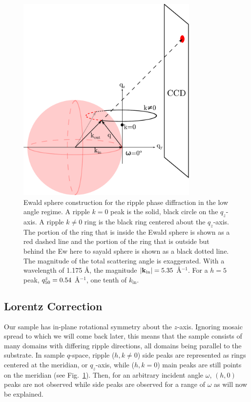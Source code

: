 \begin{figure}[htbp]
  \centering
  \includegraphics[width=0.8\textwidth]{figures/ripple/analysis/ripple_sample_qspace}
  \caption{Ewald sphere construction for the ripple phase diffraction in
  the low angle regime. A ripple $k=0$ peak is the solid, black circle
  on the $q_z$-axis.
  A ripple $k\neq 0$ ring is the black ring centered about the $q_z$-axis. 
  The portion of the ring that is 
  inside the Ewald sphere is shown as a red dashed line and the portion of the 
  ring that is outside but behind the Ew here to sayald sphere is shown as a black
  dotted line. The magnitude of the total scattering angle is exaggerated. 
  With a wavelength
  of 1.175 \AA, the magnitude $|\mathbf{k}_{\mathrm{in}}|=5.35$ \AA$^{-1}$. For a $h=5$ peak,
  $q_{50}^z=0.54$ \AA$^{-1}$, one tenth of $k_\textrm{in}$.}
  \label{fig:ripple_sample_qspace}
\end{figure}

\subsection{Lorentz Correction}\label{sec:Lorentz_correction}
Our sample has in-plane rotational symmetry about the $z$-axis. 
Ignoring mosaic spread to which we will come back later, this means that the sample 
consists of many domains with differing ripple directions, all domains
being parallel to the substrate.  
In sample $q$-space, ripple ($h,k\neq 0$) side peaks are represented as rings 
centered at the meridian, or $q_z$-axis, 
while ($h,k=0$) main peaks are still points on the meridian 
(see Fig.~\ref{fig:ripple_sample_qspace}). 
Then, for an arbitrary incident angle $\omega$, $(h,0)$ peaks are not observed
while side peaks are observed for a range of $\omega$ as will now be explained. 

